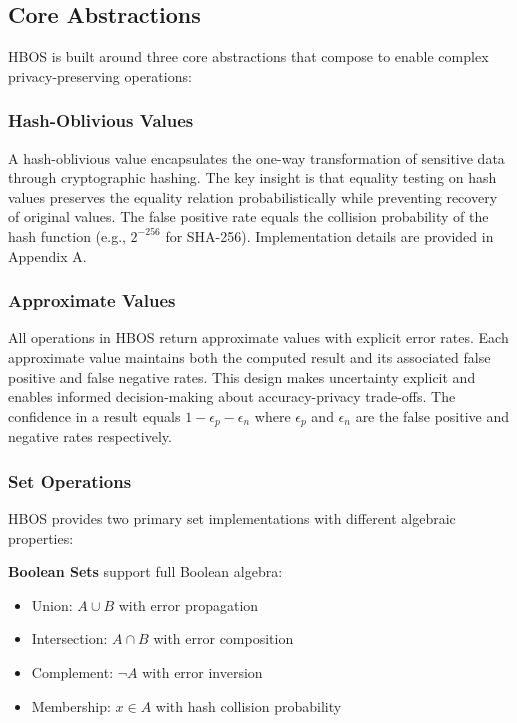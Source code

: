\documentclass[10pt,conference]{IEEEtran}
\begin{document}
\subsection{Core Abstractions}

HBOS is built around three core abstractions that compose to enable complex privacy-preserving operations:

\subsubsection{Hash-Oblivious Values}

A hash-oblivious value encapsulates the one-way transformation of sensitive data through cryptographic hashing. The key insight is that equality testing on hash values preserves the equality relation probabilistically while preventing recovery of original values. The false positive rate equals the collision probability of the hash function (e.g., $2^{-256}$ for SHA-256). Implementation details are provided in Appendix A.

\subsubsection{Approximate Values}

All operations in HBOS return approximate values with explicit error rates. Each approximate value maintains both the computed result and its associated false positive and false negative rates. This design makes uncertainty explicit and enables informed decision-making about accuracy-privacy trade-offs. The confidence in a result equals $1 - \epsilon_p - \epsilon_n$ where $\epsilon_p$ and $\epsilon_n$ are the false positive and negative rates respectively.

\subsubsection{Set Operations}

HBOS provides two primary set implementations with different algebraic properties:

\textbf{Boolean Sets} support full Boolean algebra:
\begin{itemize}
\item Union: $A \cup B$ with error propagation
\item Intersection: $A \cap B$ with error composition
\item Complement: $\neg A$ with error inversion
\item Membership: $x \in A$ with hash collision probability
\end{itemize}
\end{document}
